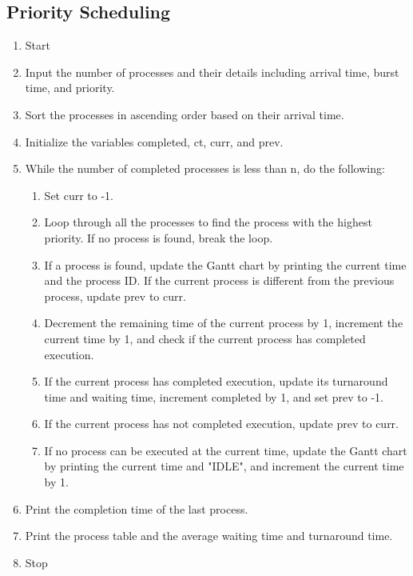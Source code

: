 \subsection{Priority Scheduling}
\begin{enumerate}
   \item Start
   \item Input the number of processes and their details including arrival time, burst time, and priority.
   \item Sort the processes in ascending order based on their arrival time.
   \item Initialize the variables completed, ct, curr, and prev.
   \item While the number of completed processes is less than n, do the following:
   \begin{enumerate}
       \item Set curr to -1.
       \item Loop through all the processes to find the process with the highest priority. If no process is found, break the loop.
       \item If a process is found, update the Gantt chart by printing the current time and the process ID. If the current process is different from the previous process, update prev to curr.
       \item Decrement the remaining time of the current process by 1, increment the current time by 1, and check if the current process has completed execution.
       \item If the current process has completed execution, update its turnaround time and waiting time, increment completed by 1, and set prev to -1.
       \item If the current process has not completed execution, update prev to curr.
       \item If no process can be executed at the current time, update the Gantt chart by printing the current time and "IDLE", and increment the current time by 1.
   \end{enumerate}
   \item Print the completion time of the last process.
   \item Print the process table and the average waiting time and turnaround time.
   \item Stop
\end{enumerate}

